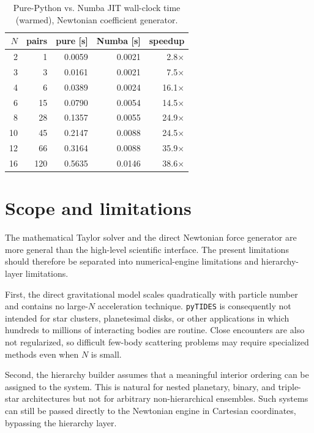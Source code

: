 \documentclass[11pt]{article}
\begin{document}
\begin{table}[h]
    \centering
    \caption{Pure-Python vs. Numba JIT wall-clock time (warmed), Newtonian coefficient generator.}
    \label{tab:numba-scaling}
    \begin{tabular}{rrrrr}
        \toprule
        $N$ & pairs & pure [s] & Numba [s] & speedup \\
        \midrule
        2  & 1   & 0.0059 & 0.0021 & 2.8$\times$ \\
        3  & 3   & 0.0161 & 0.0021 & 7.5$\times$ \\
        4  & 6   & 0.0389 & 0.0024 & 16.1$\times$ \\
        6  & 15  & 0.0790 & 0.0054 & 14.5$\times$ \\
        8  & 28  & 0.1357 & 0.0055 & 24.9$\times$ \\
        10 & 45  & 0.2147 & 0.0088 & 24.5$\times$ \\
        12 & 66  & 0.3164 & 0.0088 & 35.9$\times$ \\
        16 & 120 & 0.5635 & 0.0146 & 38.6$\times$ \\
        \bottomrule
    \end{tabular}
\end{table}


\section{Scope and limitations}
\label{sec:limitations}

The mathematical Taylor solver and the direct Newtonian force generator are
more general than the high-level scientific interface. The present
limitations should therefore be separated into numerical-engine limitations
and hierarchy-layer limitations.

First, the direct gravitational model scales quadratically with particle
number and contains no large-$N$ acceleration technique. \texttt{pyTIDES} is
consequently not intended for star clusters, planetesimal disks, or other
applications in which hundreds to millions of interacting bodies are
routine. Close encounters are also not regularized, so difficult few-body
scattering problems may require specialized methods even when $N$ is small.

Second, the hierarchy builder assumes that a meaningful interior ordering can
be assigned to the system. This is natural for nested planetary, binary, and
triple-star architectures but not for arbitrary non-hierarchical ensembles.
Such systems can still be passed directly to the Newtonian engine in
Cartesian coordinates, bypassing the hierarchy layer.
\end{document}
